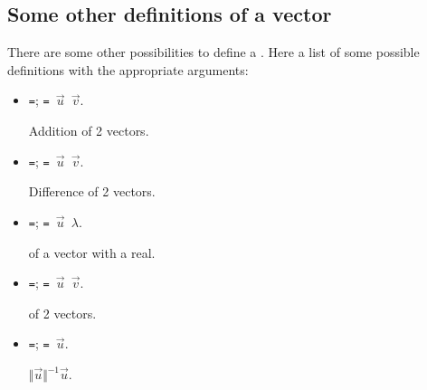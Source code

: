 \subsection{Some other definitions of a vector}

There are some other possibilities to define a . Here a list of some
possible definitions with the appropriate arguments:

\begin{itemize}

\item \texttt{=};
\texttt{= $\vec u$ $\vec v$}.

Addition of 2 vectors.

\item \texttt{=};
\texttt{= $\vec u$ $\vec v$}.

Difference of 2 vectors.

\item \texttt{=};
\texttt{= $\vec u$ $\lambda $}.

 of a vector with a real.

\item \texttt{=};
\texttt{= $\vec u$ $\vec v$}.

 of 2 vectors.

\item \texttt{=};
\texttt{= $\vec u$}.

 $\Vert \vec u\Vert ^{-1} \vec u$.

\end{itemize}

\endinput
